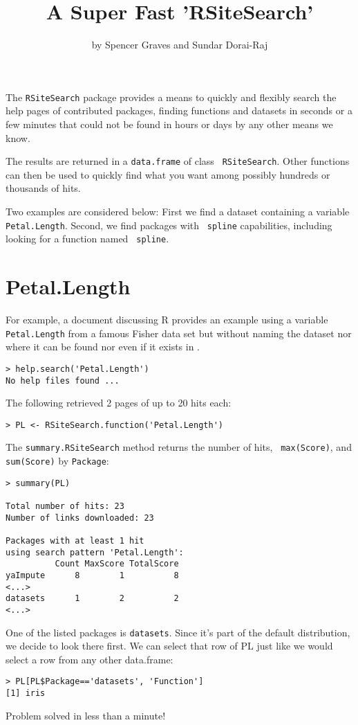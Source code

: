 \title{A Super Fast 'RSiteSearch'}
\author{by Spencer Graves and Sundar Dorai-Raj}

\maketitle

The {\tt RSiteSearch} package provides a means to quickly and
flexibly search the help pages of contributed packages, finding
functions and datasets in seconds or a few minutes that could not be
found in hours or days by any other means we know.

The results are returned in a {\tt data.frame} of class {\tt
RSiteSearch}.  Other \R{} functions can then be used to quickly find
what you want among possibly hundreds or thousands of hits.

Two examples are considered below:  First we find a dataset containing
a variable {\tt Petal.Length}.  Second, we find packages with {\tt
  spline} capabilities, including looking for a function named {\tt
  spline}.

\section*{Petal.Length}

For example, a document discussing R provides an example using a
variable {\tt Petal.Length} from a famous Fisher data set but without
naming the dataset nor where it can be found nor even if it exists in
\R{}.
\begin{verbatim}
> help.search('Petal.Length')
No help files found ...
\end{verbatim}
The following retrieved 2 pages of up to 20 hits each:
\begin{verbatim}
> PL <- RSiteSearch.function('Petal.Length')
\end{verbatim}
The {\tt summary.RSiteSearch} method returns the number of hits, {\tt
max(Score)}, and {\tt sum(Score)} by {\tt Package}:
\begin{verbatim}
> summary(PL)

Total number of hits: 23
Number of links downloaded: 23

Packages with at least 1 hit
using search pattern 'Petal.Length':
          Count MaxScore TotalScore
yaImpute      8        1          8
<...>
datasets      1        2          2
<...>
\end{verbatim}
One of the listed packages is {\tt datasets}.  Since it's part of the
default \R{} distribution, we decide to look there first.  We can
select that row of PL just like we would select a row from any other
data.frame:
\begin{verbatim}
> PL[PL$Package=='datasets', 'Function']
[1] iris
\end{verbatim}
Problem solved in less than a minute!

